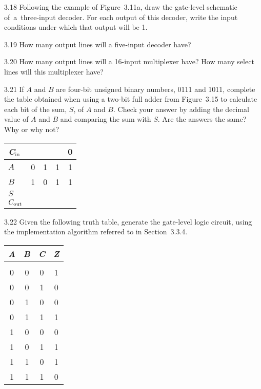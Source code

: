\documentclass{patt}
\begin{document}
\begin{exercises}
\item[3.18] Following the example of Figure~3.11a, draw the gate-level
  schematic of~a~three-input decoder. For each output of this decoder,
  write the input conditions under which that output will be 1.

\item[3.19] How many output lines will a five-input decoder have?

\item[3.20] How many output lines will a 16-input multiplexer have?
  How many select lines will this multiplexer have?

\item[3.21] If $A$ and $B$ are four-bit unsigned binary numbers, 0111
  and 1011, complete the table obtained when using a two-bit full
  adder from Figure~3.15 to calculate each bit of the sum, $S$, of $A$
  and $B$. Check your answer by adding the decimal value of $A$ and
  $B$ and comparing the sum with $S$. Are the answers the same? Why or
  why not?

\begin{inlinetable}
\tabcolsep=12pt
\begin{tabular}{@{}lcccc@{}} \hline
{\itshape C}$_{\text{in}}$
& \rule{0pt}{10pt} & & & {0}\\ \hline
$A$\rule{0pt}{10pt} & 0 & 1 & 1 & 1 \\[2.6pt]
$B$ & 1 & 0 & 1 & 1 \\[2.6pt]
$S$ & & & & \\[2.6pt]
$C_{{\rm out}}$ & & & & \\\hline
\end{tabular}
\end{inlinetable}

\item[3.22] Given the following truth table, generate the gate-level
  logic circuit, using the implementation algorithm referred to in
  Section~3.3.4.

\begin{inlinetable}
\vspace{2pt}
\tabcolsep=12pt
\begin{tabular}{@{}ccc|c@{}}\hline
{\em A} & {\em B} & {\em C} & \rule{0pt}{10pt}{\em Z}\rule{0pt}{10pt} \\ \hline\\[-7.8pt]
0 & 0 & 0 & 1 \\[2.6pt]
0 & 0 & 1 & 0 \\[2.6pt]
0 & 1 & 0 & 0 \\[2.6pt]
0 & 1 & 1 & 1 \\[2.6pt]
1 & 0 & 0 & 0 \\[2.6pt]
1 & 0 & 1 & 1 \\[2.6pt]
1 & 1 & 0 & 1 \\[2.6pt]
1 & 1 & 1 & 0 \\\hline
\end{tabular}
\end{inlinetable}



\end{exercises}
\end{document}
